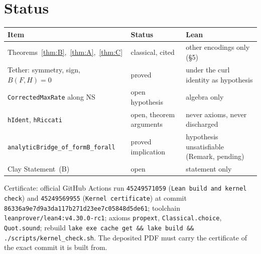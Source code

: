 \documentclass[11pt,reqno]{amsart}
\theoremstyle{definition}
\newcommand{\lean}[1]{\texttt{#1}}
\begin{document}
\section{Status}
\begin{table}[htbp]\centering\small
\begin{tabular}{@{}lll@{}}\toprule
Item & Status & Lean\\\midrule
Theorems~\ref{thm:B},~\ref{thm:A},~\ref{thm:C} & classical, cited & other encodings only (\S5)\\
Tether: symmetry, sign, $B(F,H)=0$ & proved & under the curl identity as hypothesis\\
\lean{CorrectedMaxRate} along NS & open hypothesis & algebra only\\
\lean{hIdent}, \lean{hRiccati} & open, theorem arguments & never axioms, never discharged\\
\lean{analyticBridge\_of\_formB\_forall} & proved implication & hypothesis unsatisfiable (Remark, pending)\\
Clay Statement~(B) & open & statement only\\\bottomrule
\end{tabular}\end{table}
\noindent Certificate: official GitHub Actions run \texttt{45249571059} (\lean{Lean build and kernel check}) and \texttt{45249569955} (\lean{Kernel certificate}) at commit \texttt{86336a9e7d9a3da117b271d23ee7c05848d5de61}; toolchain \texttt{leanprover/lean4:v4.30.0-rc1}; axioms \lean{propext}, \lean{Classical.choice}, \lean{Quot.sound}; rebuild \texttt{lake exe cache get \&\& lake build \&\& ./scripts/kernel\_check.sh}. The deposited PDF must carry the certificate of the exact commit it is built from.
\end{document}
